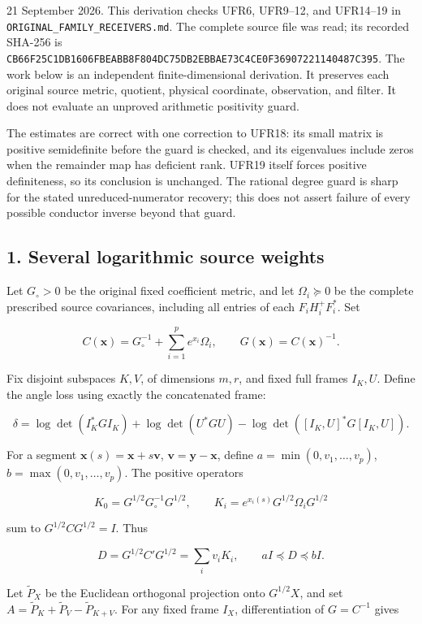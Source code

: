 \documentclass[11pt]{article}
\begin{document}
21 September 2026. This derivation checks UFR6, UFR9--12, and UFR14--19 in \nolinkurl{ORIGINAL_FAMILY_RECEIVERS.md}. The complete source file was read; its recorded SHA-256 is \nolinkurl{CB66F25C1DB1606FBEABB8F804DC75DB2EBBAE73C4CE0F36907221140487C395}. The work below is an independent finite-dimensional derivation. It preserves each original source metric, quotient, physical coordinate, observation, and filter. It does not evaluate an unproved arithmetic positivity guard.

The estimates are correct with one correction to UFR18: its small matrix is positive semidefinite before the guard is checked, and its eigenvalues include zeros when the remainder map has deficient rank. UFR19 itself forces positive definiteness, so its conclusion is unchanged. The rational degree guard is sharp for the stated unreduced-numerator recovery; this does not assert failure of every possible conductor inverse beyond that guard.

\subsection{1. Several logarithmic source weights}\label{several-logarithmic-source-weights}

Let \(G_\circ>0\) be the original fixed coefficient metric, and let \(\Omega_i\succeq0\) be the complete prescribed source covariances, including all entries of each \(F_iH_i^+F_i^*\). Set

\[
C(\mathbf x)=G_\circ^{-1}+\sum_{i=1}^p e^{x_i}\Omega_i,
\qquad G(\mathbf x)=C(\mathbf x)^{-1}.
\tag{IFE1}
\]

Fix disjoint subspaces \(K,V\), of dimensions \(m,r\), and fixed full frames \(I_K,U\). Define the angle loss using exactly the concatenated frame:

\[
\delta=\log\det(I_K^*GI_K)+\log\det(U^*GU)
-\log\det([I_K,U]^*G[I_K,U]).
\tag{IFE2}
\]

For a segment \(\mathbf x(s)=\mathbf x+s\mathbf v\), \(\mathbf v=\mathbf y-\mathbf x\), define \(a=\min(0,v_1,\ldots,v_p)\), \(b=\max(0,v_1,\ldots,v_p)\). The positive operators

\[
K_0=G^{1/2}G_\circ^{-1}G^{1/2},\qquad
K_i=e^{x_i(s)}G^{1/2}\Omega_iG^{1/2}
\]

sum to \(G^{1/2}CG^{1/2}=I\). Thus

\[
D=G^{1/2}C'G^{1/2}=\sum_i v_iK_i,
\qquad aI\preceq D\preceq bI.
\tag{IFE3}
\]

Let \(\widetilde P_X\) be the Euclidean orthogonal projection onto \(G^{1/2}X\), and set \(A=\widetilde P_K+\widetilde P_V-\widetilde P_{K+V}\). For any fixed frame \(I_X\), differentiation of \(G=C^{-1}\) gives
\end{document}
